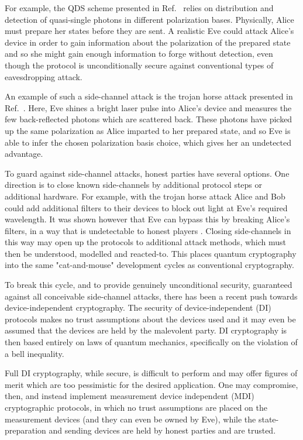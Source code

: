 For example, the QDS scheme presented in Ref.~\cite{Amiri2016} relies on distribution and detection of quasi-single photons  in different polarization bases. Physically, Alice must prepare her states before they are sent. A realistic Eve could attack Alice's device in order to gain information about the polarization of the prepared state and so she might gain enough information to forge without detection, even though the protocol is unconditionally secure against conventional types of eavesdropping attack.

An example of such a side-channel attack  is the trojan horse attack presented in Ref.~\cite{Jain2014}. Here, Eve shines a bright laser pulse into Alice's device and measures the few back-reflected photons which are scattered back. These photons have picked up the same polarization as Alice imparted to her prepared state, and so Eve is able to infer the chosen polarization basis choice, which gives her an undetected advantage.

To guard against side-channel attacks, honest parties have several options. One direction is to close known side-channels by additional protocol steps or additional hardware. For example, with the trojan horse attack Alice and Bob could add additional filters to their devices to block out light at Eve's required wavelength. It was shown however that Eve can bypass this by breaking Alice's filters, in a way that is undetectable to honest players . Closing side-channels in this way may open up the protocols to additional attack methods, which must then be understood, modelled and reacted-to. This places quantum cryptography into the same "cat-and-mouse" development cycles as conventional cryptography. 

To break this cycle, and to provide genuinely unconditional security, guaranteed against all conceivable side-channel attacks, there has been a recent push towards device-independent cryptography. The security of device-independent (DI) protocols makes no trust assumptions about the devices used and it may even be assumed that the  devices are held by the malevolent party. DI cryptography is then based entirely on laws of quantum mechanics, specifically on the violation of a bell inequality. 

Full DI cryptography, while secure, is difficult to perform and may offer figures of merit which are too pessimistic for the desired application. One may compromise, then, and instead implement measurement device independent (MDI) cryptographic protocols, in which no trust assumptions are placed on the measurement devices (and they can even be owned by Eve), while the state-preparation and sending devices are held by honest parties and are trusted. 


